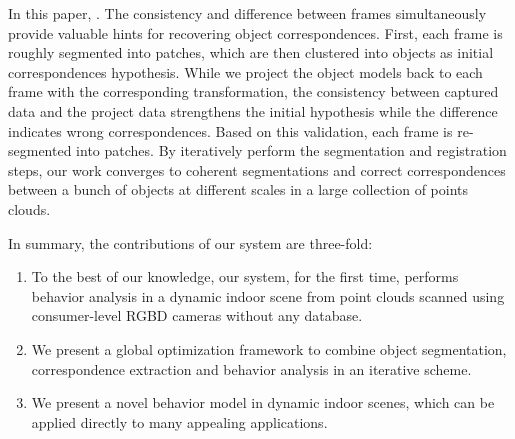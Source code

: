   

In this paper, .
%
The consistency and difference between frames simultaneously provide valuable hints for recovering object correspondences.
%
First, each frame is roughly segmented into patches, which are then clustered into objects as initial correspondences hypothesis. 
%
While we project the object models back to each frame with the corresponding transformation, the consistency between captured data and the project data strengthens the initial hypothesis while the difference indicates wrong correspondences. 
%
Based on this validation, each frame is re-segmented into patches. 
By iteratively perform the segmentation and registration steps, our work converges to coherent segmentations and correct correspondences between a bunch of objects at different scales in a large collection of points clouds. 



In summary, the contributions of our system are three-fold:
\begin{enumerate}
	\item To the best of our knowledge, our system, for the first time, performs behavior analysis in a dynamic indoor scene from point clouds scanned using consumer-level RGBD cameras without any database.
	\item We present a global optimization framework to combine object segmentation, correspondence extraction and behavior analysis in an iterative scheme. 
	\item We present a novel behavior model in dynamic indoor scenes, which can be applied directly to many appealing applications.  
\end{enumerate}




